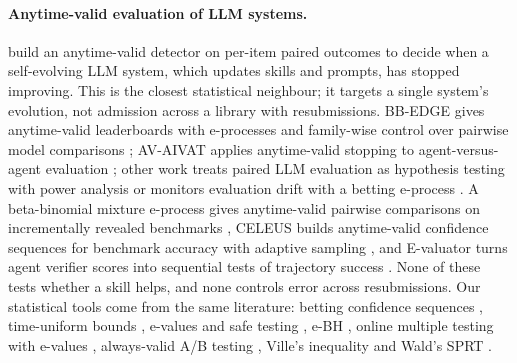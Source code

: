 \paragraph{Anytime-valid evaluation of LLM systems.} \citet{yin2026enough} build an anytime-valid detector on per-item paired outcomes to decide when a self-evolving LLM system, which updates skills and prompts, has stopped improving. This is the closest statistical neighbour; it targets a single system's evolution, not admission across a library with resubmissions. BB-EDGE gives anytime-valid leaderboards with e-processes and family-wise control over pairwise model comparisons \citep{gao2026bbedge}; AV-AIVAT applies anytime-valid stopping to agent-versus-agent evaluation \citep{li2026avaivat}; other work treats paired LLM evaluation as hypothesis testing with power analysis \citep{kotawala2026resolution} or monitors evaluation drift with a betting e-process \citep{li2026whodrifted}. A beta-binomial mixture e-process gives anytime-valid pairwise comparisons on incrementally revealed benchmarks \citep{kotawala2026pairwise}, CELEUS builds anytime-valid confidence sequences for benchmark accuracy with adaptive sampling \citep{zhou2026celeus}, and E-valuator turns agent verifier scores into sequential tests of trajectory success \citep{sadhuka2025evaluator}. None of these tests whether a skill helps, and none controls error across resubmissions. Our statistical tools come from the same literature: betting confidence sequences \citep{waudbysmith2024betting}, time-uniform bounds \citep{howard2021timeuniform}, e-values and safe testing \citep{ramdas2023gametheoretic,grunwald2024safe}, e-BH \citep{wang2022ebh}, online multiple testing with e-values \citep{xu2024online}, always-valid A/B testing \citep{johari2022always}, Ville's inequality \citep{ville1939etude} and Wald's SPRT \citep{wald1945sequential}.

